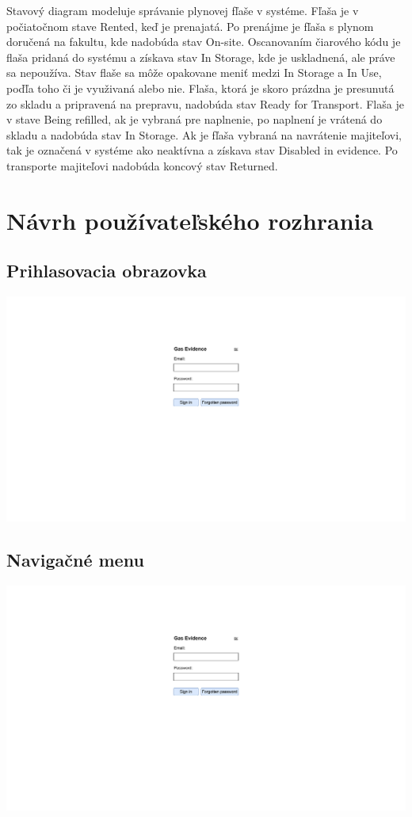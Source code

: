 \documentclass{zah}
\begin{document}
Stavový diagram modeluje správanie plynovej fľaše v systéme. Fľaša je v počiatočnom stave Rented, keď je prenajatá.
Po prenájme je fľaša s plynom doručená na fakultu, kde nadobúda stav On-site. Oscanovaním čiarového kódu je 
flaša pridaná do systému a získava stav In Storage, kde je uskladnená, ale práve sa nepoužíva. Stav flaše sa
môže opakovane meniť medzi In Storage a In Use, poďľa toho či je využivaná alebo nie. Flaša, ktorá je skoro prázdna
je presunutá zo skladu a pripravená na prepravu, nadobúda stav Ready for Transport. Flaša je v stave Being refilled,
ak je vybraná pre naplnenie, po naplnení je vrátená do skladu a nadobúda stav In Storage. Ak je fľaša vybraná na navrátenie
majiteľovi, tak je označená v systéme ako neaktívna a získava stav Disabled in evidence. Po transporte majiteľovi nadobúda
koncový stav Returned.

\section{Návrh používateľského rozhrania}

\subsection{Prihlasovacia obrazovka}
\begin{center}
\includegraphics[width=.7\textwidth,page=1]{navrh-assets/ui}
\end{center}

\subsection{Navigačné menu}
\begin{center}
\includegraphics[width=.7\textwidth,page=2]{navrh-assets/ui}
\end{center}
\end{document}
